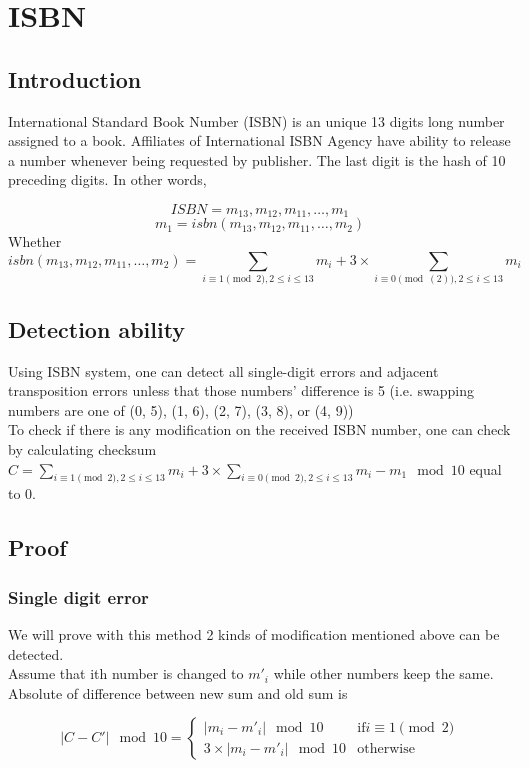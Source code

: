 \chapter{ISBN}
\section{Introduction}
International Standard Book Number (ISBN) is an unique 13 digits long number assigned to a book. Affiliates of International ISBN Agency have ability to release a number whenever being requested by publisher. The last digit is the hash of 10 preceding digits. In other words,

$$
ISBN = m_{13}, m_{12}, m_{11}, \ldots, m_1
$$
$$
m_1 = isbn(m_{13}, m_{12}, m_{11}, \ldots, m_2)
$$
Whether
$$
isbn(m_{13}, m_{12}, m_{11}, \ldots, m_2) = \sum_{i \equiv 1 \pmod{2}, 2\leq i \leq 13} m_i + 3 \times \sum_{i \equiv 0 \pmod(2), 2\leq i \leq 13 }m_i
$$

\section{Detection ability}
Using ISBN system, one can detect all single-digit errors and adjacent transposition errors unless that those numbers' difference is 5 (i.e. swapping numbers are one of (0, 5), (1, 6), (2, 7), (3, 8), or (4, 9))\\

To check if there is any modification on the received ISBN number, one can check by calculating checksum $C = \sum_{i \equiv 1 \pmod{2}, 2\leq i \leq 13} m_i + 3 \times \sum_{i \equiv 0 \pmod{2}, 2\leq i \leq 13 }m_i - m_1 \mod 10$ equal to 0.\\

\section{Proof}
\subsection{Single digit error}
We will prove with this method 2 kinds of modification mentioned above can be detected.\\
Assume that ith number is changed to $m'_i$ while other numbers keep the same. Absolute of difference between new sum and old sum is

$$
|C - C'| \mod 10 =
\begin{cases}
|m_i - m'_i| \mod 10 &\text{if} i \equiv 1 \pmod{2}
\\
 3 \times |m_i - m'_i| \mod 10 &\text{otherwise}
\end{cases}
$$

